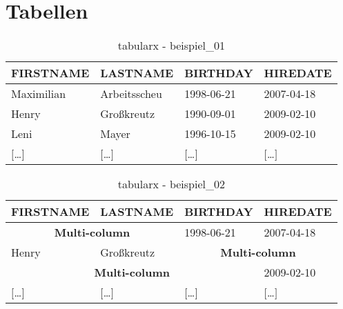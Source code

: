 \section{Tabellen}

\begin{table}[H]
  \begin{tabularx}{\textwidth}{X|X|X|X}
    \textbf{FIRSTNAME} & \textbf{LASTNAME} & \textbf{BIRTHDAY} & \textbf{HIREDATE} \\
    \hline\hline
    Maximilian & Arbeitsscheu & 1998-06-21 & 2007-04-18 \\
    Henry & Großkreutz & 1990-09-01 & 2009-02-10 \\
    Leni & Mayer & 1996-10-15 & 2009-02-10 \\
    $[$\dots$]$ & $[$\dots$]$ & $[$\dots$]$ & $[$\dots$]$ \\
  \end{tabularx}
  \caption{tabularx - beispiel\_01}
  \label{tbl:beispiel_01}
\end{table}

\begin{table}[H]
  \begin{tabularx}{\textwidth}{X|X|X|X}
    \textbf{FIRSTNAME} & \textbf{LASTNAME} & \textbf{BIRTHDAY} & \textbf{HIREDATE} \\
    \hline\hline
    \multicolumn{2}{c|}{\textbf{Multi-column}} & 1998-06-21 & 2007-04-18 \\
    Henry & Großkreutz & \multicolumn{2}{c}{\textbf{Multi-column}} \\
    \multicolumn{3}{c|}{\textbf{Multi-column}} & 2009-02-10 \\
    $[$\dots$]$ & $[$\dots$]$ & $[$\dots$]$ & $[$\dots$]$ \\
  \end{tabularx}
  \caption{tabularx - beispiel\_02}
  \label{tbl:beispiel_02}
\end{table}


